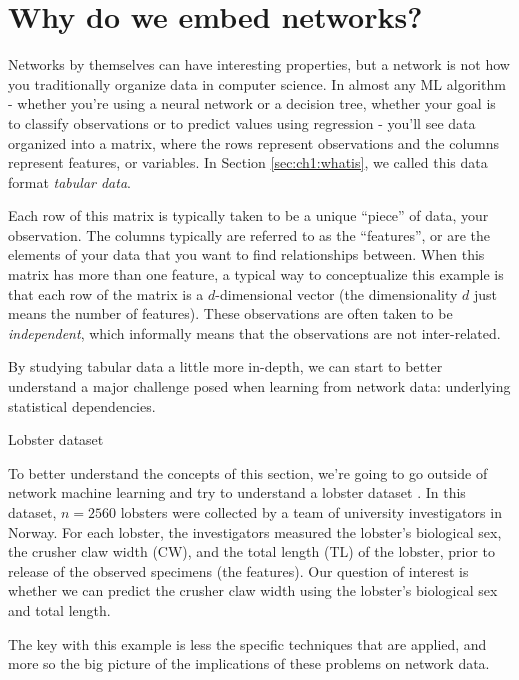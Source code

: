 \section{Why do we embed networks?}
\label{sec:ch6:why}

Networks by themselves can have interesting properties, but a network is not how you traditionally organize data in computer science. In almost any ML algorithm - whether you're using a neural network or a decision tree, whether your goal is to classify observations or to predict values using regression - you'll see data organized into a matrix, where the rows represent observations and the columns represent features, or variables. In Section \ref{sec:ch1:whatis}, we called this data format \textit{tabular data}. 

Each row of this matrix is typically taken to be a unique ``piece'' of data, your observation. The columns typically are referred to as the ``features'', or are the elements of your data that you want to find relationships between. When this matrix has more than one feature, a typical way to conceptualize this example is that each row of the matrix is a $d$-dimensional vector (the dimensionality $d$ just means the number of features). These observations are often taken to be \textit{independent}, which informally means that the observations are not inter-related. 

By studying tabular data a little more in-depth, we can start to better understand a major challenge posed when learning from network data: underlying statistical dependencies.

\begin{floatingbox}[h]\caption{Lobster dataset}
To better understand the concepts of this section, we're going to go outside of network machine learning and try to understand a lobster dataset \cite{Sordalen2020Oct}. In this dataset, $n=2560$ lobsters were collected by a team of university investigators in Norway. For each lobster, the investigators measured the lobster's biological sex, the crusher claw width (CW), and the total length (TL) of the lobster, prior to release of the observed specimens (the features). Our question of interest is whether we can predict the crusher claw width using the lobster's biological sex and total length.
\end{floatingbox}

The key with this example is less the specific techniques that are applied, and more so the big picture of the implications of these problems on network data.

